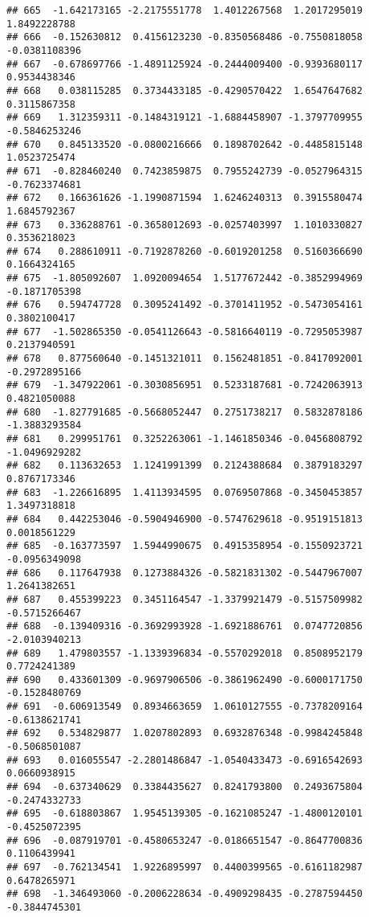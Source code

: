 \documentclass[
]{article}
\begin{document}
\begin{verbatim}
## 665  -1.642173165 -2.2175551778  1.4012267568  1.2017295019  1.8492228788
## 666  -0.152630812  0.4156123230 -0.8350568486 -0.7550818058 -0.0381108396
## 667  -0.678697766 -1.4891125924 -0.2444009400 -0.9393680117  0.9534438346
## 668   0.038115285  0.3734433185 -0.4290570422  1.6547647682  0.3115867358
## 669   1.312359311 -0.1484319121 -1.6884458907 -1.3797709955 -0.5846253246
## 670   0.845133520 -0.0800216666  0.1898702642 -0.4485815148  1.0523725474
## 671  -0.828460240  0.7423859875  0.7955242739 -0.0527964315 -0.7623374681
## 672   0.166361626 -1.1990871594  1.6246240313  0.3915580474  1.6845792367
## 673   0.336288761 -0.3658012693 -0.0257403997  1.1010330827  0.3536218023
## 674   0.288610911 -0.7192878260 -0.6019201258  0.5160366690  0.1664324165
## 675  -1.805092607  1.0920094654  1.5177672442 -0.3852994969 -0.1871705398
## 676   0.594747728  0.3095241492 -0.3701411952 -0.5473054161  0.3802100417
## 677  -1.502865350 -0.0541126643 -0.5816640119 -0.7295053987  0.2137940591
## 678   0.877560640 -0.1451321011  0.1562481851 -0.8417092001 -0.2972895166
## 679  -1.347922061 -0.3030856951  0.5233187681 -0.7242063913  0.4821050088
## 680  -1.827791685 -0.5668052447  0.2751738217  0.5832878186 -1.3883293584
## 681   0.299951761  0.3252263061 -1.1461850346 -0.0456808792 -1.0496929282
## 682   0.113632653  1.1241991399  0.2124388684  0.3879183297  0.8767173346
## 683  -1.226616895  1.4113934595  0.0769507868 -0.3450453857  1.3497318818
## 684   0.442253046 -0.5904946900 -0.5747629618 -0.9519151813  0.0018561229
## 685  -0.163773597  1.5944990675  0.4915358954 -0.1550923721 -0.0956349098
## 686   0.117647938  0.1273884326 -0.5821831302 -0.5447967007  1.2641382651
## 687   0.455399223  0.3451164547 -1.3379921479 -0.5157509982 -0.5715266467
## 688  -0.139409316 -0.3692993928 -1.6921886761  0.0747720856 -2.0103940213
## 689   1.479803557 -1.1339396834 -0.5570292018  0.8508952179  0.7724241389
## 690   0.433601309 -0.9697906506 -0.3861962490 -0.6000171750 -0.1528480769
## 691  -0.606913549  0.8934663659  1.0610127555 -0.7378209164 -0.6138621741
## 692   0.534829877  1.0207802893  0.6932876348 -0.9984245848 -0.5068501087
## 693   0.016055547 -2.2801486847 -1.0540433473 -0.6916542693  0.0660938915
## 694  -0.637340629  0.3384435627  0.8241793800  0.2493675804 -0.2474332733
## 695  -0.618803867  1.9545139305 -0.1621085247 -1.4800120101 -0.4525072395
## 696  -0.087919701 -0.4580653247 -0.0186651547 -0.8647700836  0.1106439941
## 697  -0.762134541  1.9226895997  0.4400399565 -0.6161182987  0.6478265971
## 698  -1.346493060 -0.2006228634 -0.4909298435 -0.2787594450 -0.3844745301

\end{verbatim}
\end{document}
